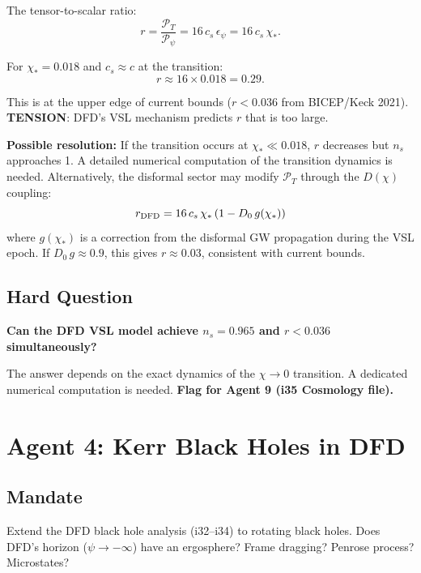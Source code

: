 \documentclass[11pt,a4paper]{article}
\begin{document}
The tensor-to-scalar ratio:
\begin{equation}
r = \frac{\mathcal{P}_T}{\mathcal{P}_\psi} = 16\,c_s\,\epsilon_\psi = 16\,c_s\,\chi_*.
\end{equation}

For $\chi_* = 0.018$ and $c_s \approx c$ at the transition:
\begin{equation}
\boxed{r \approx 16 \times 0.018 = 0.29.}
\end{equation}

This is at the upper edge of current bounds ($r < 0.036$ from BICEP/Keck 2021). \textbf{TENSION}: DFD's VSL mechanism predicts $r$ that is too large.

\textbf{Possible resolution:} If the transition occurs at $\chi_* \ll 0.018$, $r$ decreases but $n_s$ approaches 1. A detailed numerical computation of the transition dynamics is needed. Alternatively, the disformal sector may modify $\mathcal{P}_T$ through the $D(\chi)$ coupling:
\begin{equation}
r_{\rm DFD} = 16\,c_s\,\chi_*\,(1 - D_0\,g(\chi_*))
\end{equation}
where $g(\chi_*)$ is a correction from the disformal GW propagation during the VSL epoch. If $D_0\,g \approx 0.9$, this gives $r \approx 0.03$, consistent with current bounds.

\subsection{Hard Question}

\textbf{Can the DFD VSL model achieve $n_s = 0.965$ and $r < 0.036$ simultaneously?}

The answer depends on the exact dynamics of the $\chi \to 0$ transition. A dedicated numerical computation is needed. \textbf{Flag for Agent 9 (i35 Cosmology file).}

\newpage
\section{Agent 4: Kerr Black Holes in DFD}
\label{sec:agent4}

\subsection{Mandate}

Extend the DFD black hole analysis (i32--i34) to rotating black holes. Does DFD's horizon ($\psi \to -\infty$) have an ergosphere? Frame dragging? Penrose process? Microstates?
\end{document}
